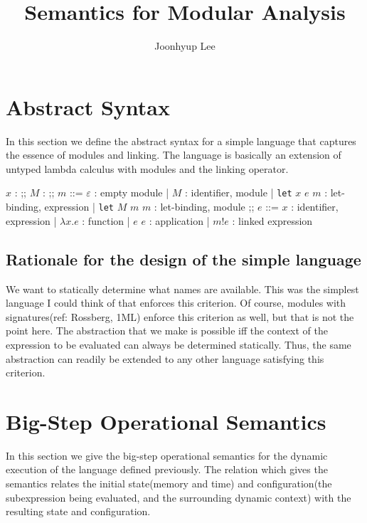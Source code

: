 \documentclass{article}
\title{Semantics for Modular Analysis}
\author{Joonhyup Lee}
\date{}
\newcommand*{\ExprVar}{\mathit{ExprVar}}
\newcommand*{\ModVar}{\mathit{ModVar}}
\newcommand*{\link}[2]{{#1}\mathtt{!}{#2}}
\begin{document}
\maketitle

\section{Abstract Syntax}

In this section we define the abstract syntax for a simple language that captures the essence of modules and linking.
The language is basically an extension of untyped lambda calculus with modules and the linking operator.

\begin{bnfgrammar}
  $x$ : \in \ExprVar
  ;;
  $M$ : \in \ModVar
  ;;
  $m$ ::= $\varepsilon$ : empty module
  | $M$ : identifier, module
  | \texttt{let} $x$ $e$ $m$ : let-binding, expression
  | \texttt{let} $M$ $m$ $m$ : let-binding, module
  ;;
  $e$ ::= $x$ : identifier, expression
  | $\lambda x.e$ : function
  | $e$ $e$ : application
  | $\link{m}{e}$ : linked expression
\end{bnfgrammar}

\subsection{Rationale for the design of the simple language}

We want to statically determine what names are available.
This was the simplest language I could think of that enforces this criterion.
Of course, modules with signatures(ref: Rossberg, 1ML) enforce this criterion as well, but that is not the point here.
The abstraction that we make is possible iff the context of the expression to be evaluated can always be determined statically.
Thus, the same abstraction can readily be extended to any other language satisfying this criterion.

\section{Big-Step Operational Semantics}

In this section we give the big-step operational semantics for the dynamic execution of the language defined previously.
The relation which gives the semantics relates the initial state(memory and time) and configuration(the subexpression being evaluated, and the surrounding dynamic context) with the resulting state and configuration.
\end{document}
